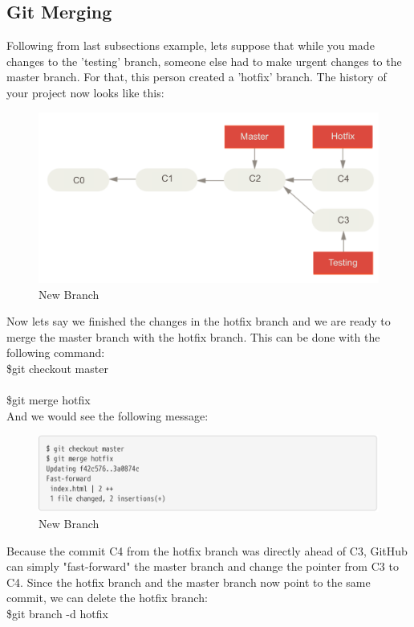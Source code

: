 \documentclass[12pt]{article}
\begin{document}
    \subsection{Git Merging}
    Following from last subsection\textquotesingle s example, let\textquotesingle s suppose that while you made changes to the 'testing' branch, someone else had to make urgent changes to the master branch. For that, this person created a 'hotfix' branch. The history of your project now looks like this: 
    \vspace{0.3 in}
    \begin{figure}[h]
	\caption{New Branch}
	\includegraphics[scale=0.5]{figure7}
	\centering
    \end{figure} 
    \vspace{5 in}
    Now let\textquotesingle s say we finished the changes in the hotfix branch and we are ready to merge the master branch with the hotfix branch. This can be done with the following command:\\
    \indent\indent \$git checkout master \\ \\
    \indent\indent \$git merge hotfix \\
    And we would see the following message:
    \begin{figure}[h]
	\caption{New Branch}
	\includegraphics[scale=0.5]{figure8}
	\centering
    \end{figure} 
    \vspace{0.2 in}
    Because the commit C4 from the hotfix branch was directly ahead of C3, GitHub can simply "fast-forward" the master branch and change the pointer from C3 to C4. Since the hotfix branch and the master branch now point to the same commit, we can delete the hotfix branch: \\
    \indent\indent \$git branch -d hotfix 
\end{document}
